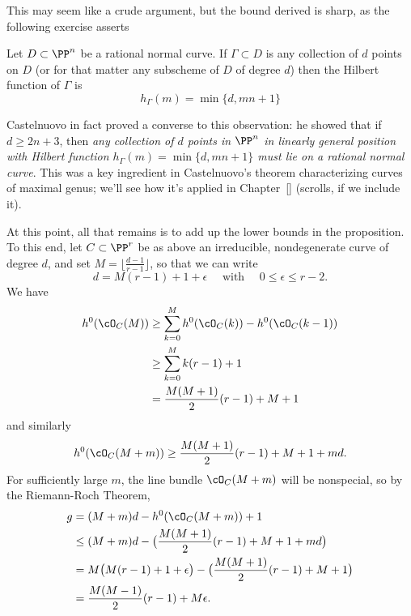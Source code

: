 This may seem like a crude argument, but the bound derived is sharp, as the following exercise asserts

\begin{exercise}
Let $D \subset \PP^n$ be a rational normal curve. If $\Gamma \subset D$ is any collection of $d$ points on $D$ (or for that matter any subscheme of $D$ of degree $d$) then the Hilbert function of $\Gamma$ is
$$
h_\Gamma(m) = \min\{d, mn+1\}
$$
\end{exercise} 

\begin{fact}
Castelnuovo in fact proved a converse to this observation: he showed that if $d \geq 2n+3$, then \emph{any collection of $d$ points in $\PP^n$ in linearly general position with Hilbert function $h_\Gamma(m) = \min\{d, mn+1\}$ must lie on a rational normal curve}. This was a key ingredient in Castelnuovo's theorem characterizing curves of maximal genus; we'll see how it's applied in Chapter~\ref{} (scrolls, if we include it).
\end{fact}

At this point, all that remains is to add up the lower bounds in the proposition. To this end, let $C \subset \PP^r$ be as above an irreducible, nondegenerate curve of degree $d$, and set $M = \lfloor{\frac{d-1}{r-1}}\rfloor$, so that we can write
$$
d = M(r-1) + 1 + \epsilon \quad \text{ with } \quad 0 \leq \epsilon \leq r-2.
$$
We have 
\begin{align*}
h^0(\cO_C(M)) &\geq \sum_{k=0}^M h^0(\cO_C(k)) - h^0(\cO_C(k-1)) \\
&\geq  \sum_{k=0}^M k(r-1)+1 \\
&= \frac{M(M+1)}{2}(r-1) + M + 1
\end{align*}
and similarly
$$
h^0(\cO_C(M+m)) \geq \frac{M(M+1)}{2}(r-1) + M + 1 + md.
$$
For sufficiently large $m$, the line bundle $\cO_C(M+m)$ will be nonspecial, so by the Riemann-Roch Theorem,
\begin{align*}
g &= (M+m)d - h^0(\cO_C(M+m)) + 1 \\
&\leq (M+m)d - \bigl(  \frac{M(M+1)}{2}(r-1) + M + 1 + md \bigr) \\
& = M\bigl( M(r-1) + 1 + \epsilon \bigr) - \bigl(  \frac{M(M+1)}{2}(r-1) + M + 1 \bigr) \\
&= \frac{M(M-1)}{2}(r-1) + M\epsilon.
\end{align*}


